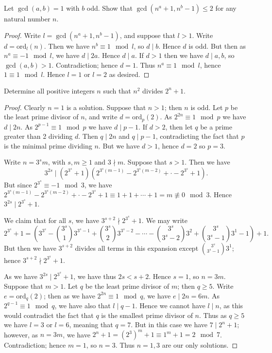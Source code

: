 \begin{prb}
Let $\gcd{(a,b)} = 1$ with $b$ odd.  Show that $\gcd{(n^a+1,
n^b-1)}\leq 2$ for any natural number $n$.
\begin{proof}
Write $l = \gcd{(n^a+1,n^b-1)}$, and suppose that $l > 1$.  Write $d = \text{ord}_l(n)$.  Then we have $n^b \equiv 1\mod{l}$, so $d \mid b$.  Hence $d$ is odd.  But then as $n^a \equiv -1\mod{l}$, we have $d \mid 2a$.  Hence $d \mid a$.  If $d > 1$ then we have $d \mid a,b$, so $\gcd{(a,b)} > 1$.  Contradiction; hence $d = 1$.  Thus $n^a \equiv 1\mod{l}$, hence $1 \equiv 1\mod{l}$.  Hence $l = 1$ or $l = 2$ as desired.
\end{proof}
\end{prb}
\begin{prb}[IMO 1990/3]
Determine all positive integers $n$ such that $n^2$ divides $2^n+1$.
\begin{proof}
Clearly $n = 1$ is a solution.  Suppose that $n > 1$; then $n$ is odd.  Let $p$ be the least prime divisor of $n$, and write $d = \text{ord}_p(2)$.  As $2^{2n} \equiv 1\mod{p}$ we have $d \mid 2n$.  As $2^{p-1}\equiv1\mod{p}$ we have $d \mid p-1$.  If $d > 2$, then let $q$ be a prime greater than 2 dividing $d$.  Then $q \mid 2n$ and $q \mid p-1$, contradicting the fact that $p$ is the minimal prime dividing $n$.  But we have $d > 1$, hence $d = 2$ so $p = 3$.

Write $n = 3^sm$, with $s,m \ge 1$ and $3 \nmid m$.  Suppose that $s > 1$.  Then we have $$3^{2s}\mid\left(2^{3^s}+1\right)\left(2^{3^s(m-1)}-2^{3^s(m-2)}+\cdot-2^{3^s}+1\right).$$  But since $2^{3^s}\equiv-1\mod{3}$, we have $2^{3^s(m-1)}-2^{3^s(m-2)}+\cdot-2^{3^s}+1\equiv1+1+\cdots+1=m\not\equiv0\mod{3}$.  Hence $3^{2s}\mid 2^{3^s}+1$.

We claim that for all $s$, we have $3^{s+2}\nmid 2^{3^s}+1$.  We may write $$2^{3^s}+1 = \left(3^{3^s}-{3^s\choose 1}3^{3^s-1}+{3^s\choose 2}3^{3^s-2}-\cdots-{3^s\choose 3^s-2}3^2+{3^s\choose 3^s-1}3^1-1\right)+1.$$  But then we have $3^{s+2}$ divides all terms in this expansion except ${3^s\choose 3^s-1}3^1$; hence $3^{s+2}\nmid 2^{3^s}+1$.

As we have $3^{2s}\mid 2^{3^s}+1$, we have thus $2s < s+2$.  Hence $s = 1$, so $n = 3m$.  Suppose that $m > 1$.  Let $q$ be the least prime divisor of $m$; then $q \ge 5$.  Write $e = \text{ord}_q(2)$; then as we have $2^{2n} \equiv 1\mod{q}$, we have $e \mid 2n = 6m$.  As $2^{q-1} \equiv 1\mod{q}$, we have also that $l \mid q-1$.  Hence we cannot have $l \mid n$, as this would contradict the fact that $q$ is the smallest prime divisor of $n$.  Thus as $q \ge 5$ we have $l = 3$ or $l = 6$, meaning that $q = 7$.  But in this case we have $7 \mid 2^n + 1$; however, as $n = 3m$, we have $2^n + 1 = (2^3)^m +1\equiv1^m+1 = 2\mod{7}$.  Contradiction; hence $m = 1$, so $n = 3$.  Thus $n = 1, 3$ are our only solutions.
\end{proof}
\end{prb}

